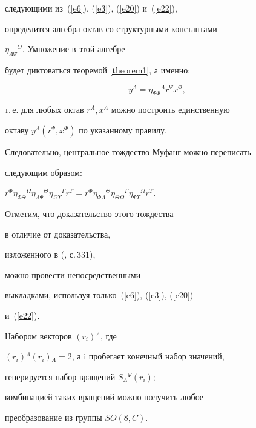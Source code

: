 следующими из~(\ref{e6}), (\ref{e3}), (\ref{e20}) и~(\ref{e22}),


определится алгебра октав со структурными константами


$\eta_{\Lambda\Psi}{}^\Theta$. Умножение в этой алгебре


будет диктоваться теоремой \ref{theorem1}, а именно:


\begin{equation}


\label{e26}


y^\Lambda=\eta_{\Psi\Phi}{}^\Lambda r^\Psi x^\Phi,


\end{equation}


т.\,е. для любых октав $r^\Lambda,x^\Lambda$ можно построить единственную


октаву $y^\Lambda (r^\Psi , x^\Phi)$ по указанному правилу.


Следовательно, центральное тождество Муфанг можно переписать


следующим образом:




$r^\Phi\eta_{\Phi\Theta}{}^\Omega\eta_{\Lambda\Psi}{}^\Theta


\eta_{\Omega\Upsilon}{}^\Gamma r^\Upsilon=


r^\Phi\eta_{\Phi\Lambda}{}^\Theta\eta_{\Theta\Omega}{}^\Gamma


\eta_{\Psi\Upsilon}{}^\Omega r^\Upsilon$.




Отметим, что доказательство этого тождества


в отличие от доказательства,


изложенного в (\cite{Postnik1}, с.\,331),


можно провести непосредственными


выкладками, используя только~(\ref{e6}), (\ref{e3}), (\ref{e20})


и~(\ref{e22}).





\begin{prop}


\label{subject1}


Набором векторов $(r_i){}^\Lambda$, где


$(r_i){}^\Lambda (r_i){}_\Lambda=2$, а i пробегает конечный набор значений,


генерируется набор вращений $S{}_\Lambda{}^\Psi (r_i);$


комбинацией таких вращений можно получить любое


преобразование из группы $SO(8,C)$.


\end{prop}





